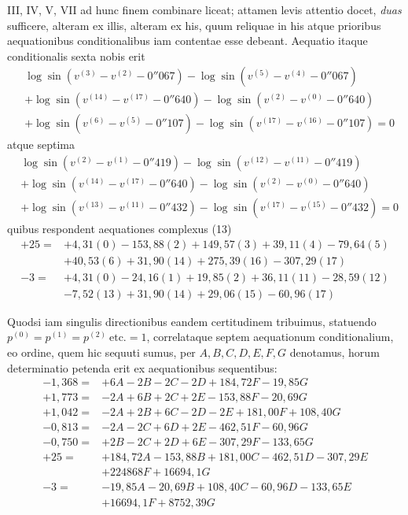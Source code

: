 III, IV, V, VII ad hunc finem combinare liceat; attamen levis attentio docet, \textit{duas} sufficere, alteram ex illis, alteram ex his, quum reliquae in his atque prioribus aequationibus conditionalibus iam contentae esse debeant. Aequatio itaque conditionalis sexta nobis erit
\[
\begin{aligned}
&\log\sin(v^{(3)}-v^{(2)}-0''067)-\log\sin(v^{(5)}-v^{(4)}-0''067)\\
&+\log\sin(v^{(14)}-v^{(17)}-0''640)-\log\sin(v^{(2)}-v^{(0)}-0''640)\\
&+\log\sin(v^{(6)}-v^{(5)}-0''107)-\log\sin(v^{(17)}-v^{(16)}-0''107)=0
\end{aligned}
\]
atque septima
\[
\begin{aligned}
&\log\sin(v^{(2)}-v^{(1)}-0''419)-\log\sin(v^{(12)}-v^{(11)}-0''419)\\
&+\log\sin(v^{(14)}-v^{(17)}-0''640)-\log\sin(v^{(2)}-v^{(0)}-0''640)\\
&+\log\sin(v^{(13)}-v^{(11)}-0''432)-\log\sin(v^{(17)}-v^{(15)}-0''432)=0
\end{aligned}
\]
quibus respondent aequationes complexus (13)
\[
\begin{aligned}
+25={}&+4{,}31(0)-153{,}88(2)+149{,}57(3)+39{,}11(4)-79{,}64(5)\\
&+40{,}53(6)+31{,}90(14)+275{,}39(16)-307{,}29(17)\\
-3={}&+4{,}31(0)-24{,}16(1)+19{,}85(2)+36{,}11(11)-28{,}59(12)\\
&-7{,}52(13)+31{,}90(14)+29{,}06(15)-60{,}96(17)
\end{aligned}
\]

Quodsi iam singulis directionibus eandem certitudinem tribuimus, statuendo \(p^{(0)}=p^{(1)}=p^{(2)}\ \text{etc.}=1\), correlataque septem aequationum conditionalium, eo ordine, quem hic sequuti sumus, per \(A,B,C,D,E,F,G\) denotamus, horum determinatio petenda erit ex aequationibus sequentibus:
\[
\begin{aligned}
-1{,}368={}&+6A-2B-2C-2D+184{,}72F-19{,}85G\\
+1{,}773={}&-2A+6B+2C+2E-153{,}88F-20{,}69G\\
+1{,}042={}&-2A+2B+6C-2D-2E+181{,}00F+108{,}40G\\
-0{,}813={}&-2A-2C+6D+2E-462{,}51F-60{,}96G\\
-0{,}750={}&+2B-2C+2D+6E-307{,}29F-133{,}65G\\
+25={}&+184{,}72A-153{,}88B+181{,}00C-462{,}51D-307{,}29E\\
&+224868F+16694{,}1G\\
-3={}&-19{,}85A-20{,}69B+108{,}40C-60{,}96D-133{,}65E\\
&+16694{,}1F+8752{,}39G
\end{aligned}
\]


